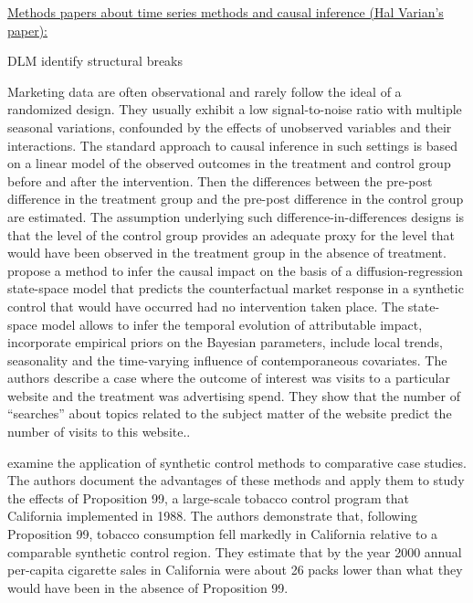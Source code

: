 
\underline{Methods papers about time series methods and causal inference (Hal Varian's paper): }

DLM identify structural breaks

Marketing data are often observational and rarely follow the ideal of a randomized design. They usually exhibit a low signal-to-noise ratio with multiple seasonal variations, confounded by the effects of unobserved variables and their interactions. The standard approach to causal inference in such settings is based on a linear model of the observed outcomes in the treatment and control group before and after the intervention. Then the differences between the pre-post difference in the treatment group and the pre-post difference in the control group are estimated. The assumption underlying such difference-in-differences designs is that the level of the control group provides an adequate proxy for the level that would have been observed in the treatment group in the absence of treatment.  \citet{brodersen2015inferring} propose a method to infer the causal impact on the basis of a diffusion-regression state-space model that predicts the counterfactual market response in a synthetic control that would have occurred had no intervention taken place. The state-space model allows to infer the temporal evolution of attributable impact, incorporate empirical priors on the Bayesian parameters, include local trends, seasonality and the time-varying influence of contemporaneous covariates. The authors describe a case where the outcome of interest was visits to a particular website and the treatment was advertising spend. They show that the number of “searches” about topics related to the subject matter of the website predict the number of visits to this website..

\citet{abadie2010synthetic} examine the application of synthetic control methods to comparative case studies. The authors document the advantages of these methods and apply them to study the effects of Proposition 99, a large-scale tobacco control program that California implemented in 1988. The authors demonstrate that, following Proposition 99, tobacco consumption fell markedly in California relative to a comparable synthetic control region. They estimate that by the year 2000 annual per-capita cigarette sales in California were about 26 packs lower than what they would have been in the absence of Proposition 99.

